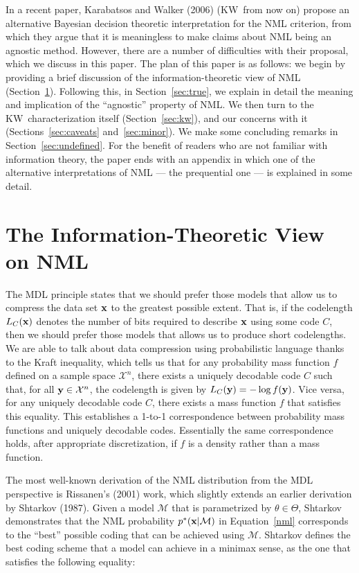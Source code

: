 \documentclass[authoryear]{elsarticle}
\newcommand{\condon}{|}
\newcommand{\model}{\mathcal{M}}
\newcommand{\sspace}[2]{\mathcal{#1}^{#2}}
\newcommand{\kw}{KW}
\newcommand{\vx}{\ensuremath{{\bf x}}}
\newcommand{\vy}{\ensuremath{{\bf y}}}
\begin{document}
In a recent paper, Karabatsos and Walker (2006) (\kw \ from now on)
propose an alternative Bayesian decision theoretic interpretation for
the NML criterion, from which they argue that it is meaningless
to make claims about NML being an agnostic method. However, there
are a number of difficulties with their proposal,  which we discuss in
this paper. The plan of this paper is as follows: we begin by providing
a brief discussion of the information-theoretic view of NML
(Section~\ref{sec:mdlview}). Following this, in
Section~\ref{sec:true}, we explain in detail the meaning and
implication of the ``agnostic'' property of NML. We then turn to the
\kw\ characterization itself (Section~\ref{sec:kw}), and our concerns
with it (Sections~\ref{sec:caveats} and~\ref{sec:minor}). We make some
concluding remarks in Section~\ref{sec:undefined}.  For the benefit of
readers who are not familiar with information theory, the paper ends
with an appendix in which one of the alternative interpretations of
NML --- the prequential one --- is explained in some detail.

\section{The Information-Theoretic View on NML}
\label{sec:mdlview}

The MDL principle states that we should prefer
those models that allow us to compress the data set
$\vx$ to the greatest possible extent. That is, if
the codelength $L_C(\vx)$ denotes the number of bits
required to describe $\vx$ using some code $C$, then we
should prefer those models that allows us to produce short
codelengths. We are able to talk about data compression
using probabilistic language thanks to the Kraft inequality, which
tells us that for any probability mass function $f$ defined on a
sample space $\sspace{X}{n}$, there exists a uniquely decodable code $C$
such that, for all $\vy \in \sspace{X}{n}$, the codelength
is given by $L_C(\vy) = - \log
f(\vy)$. Vice versa, for any uniquely decodable
code $C$, there exists a mass function $f$ that satisfies this
equality. This
establishes a 1-to-1 correspondence between probability
mass functions and uniquely decodable codes. Essentially the same
correspondence holds, after appropriate discretization, if $f$ is a
density rather than a mass function.

The most well-known derivation of the NML distribution from the MDL
perspective is Rissanen's (2001) work, which slightly extends
an earlier derivation by Shtarkov (1987).
Given a model $\model$ that is parametrized by $\theta \in
\Theta$, Shtarkov  demonstrates that the NML probability $p^*(\vx \condon
\model)$ in Equation~\ref{nml} corresponds to the ``best'' possible
coding that can be achieved using $\model$. Shtarkov defines the
best coding scheme that a model can achieve in a minimax
sense, as the one that satisfies the following equality:
\end{document}
